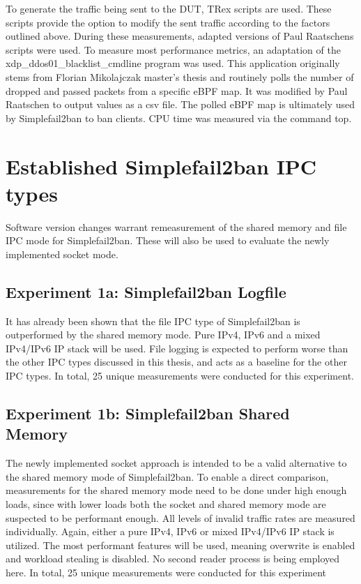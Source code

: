 \bigskip
\noindent
To generate the traffic being sent to the \ac{DUT}, TRex scripts are used.
These scripts provide the option to modify the sent traffic according to the factors outlined above.
During these measurements, adapted versions of Paul Raatschens\cite{raatschen:ipc} scripts were used.
To measure most performance metrics, an adaptation of the xdp\_ddos01\_blacklist\_cmdline program was used.
This application originally stems from Florian Mikolajczak master's thesis\cite{mikolajczak:ebpf} and routinely polls the number of dropped and passed packets from a specific \ac{eBPF} map.
It was modified by Paul Raatschen to output values as a \ac{csv} file.
The polled \ac{eBPF} map is ultimately used by Simplefail2ban to ban clients.
\ac{CPU} time was measured via the command top.

\section{Established Simplefail2ban \ac{IPC} types}
Software version changes warrant remeasurement of the shared memory and file \ac{IPC} mode for Simplefail2ban.
These will also be used to evaluate the newly implemented socket mode.

\subsection{Experiment 1a: Simplefail2ban Logfile}
It has already been shown that the file \ac{IPC} type of Simplefail2ban is outperformed by the shared memory mode.
Pure IPv4, IPv6 and a mixed IPv4/IPv6 \ac{IP} stack will be used.
File logging is expected to perform worse than the other \ac{IPC} types discussed in this thesis, and acts as a baseline for the other \ac{IPC} types.
In total, 25 unique measurements were conducted for this experiment.

\subsection{Experiment 1b: Simplefail2ban Shared Memory}
The newly implemented socket approach is intended to be a valid alternative to the shared memory mode of Simplefail2ban.
To enable a direct comparison, measurements for the shared memory mode need to be done under high enough loads, since with lower loads both the socket and shared memory mode are suspected to be performant enough.
All levels of invalid traffic rates are measured individually.
Again, either a pure IPv4, IPv6 or mixed IPv4/IPv6 \ac{IP} stack is utilized.
The most performant features will be used, meaning overwrite is enabled and workload stealing is disabled.
No second reader process is being employed here.
In total, 25 unique measurements were conducted for this experiment

